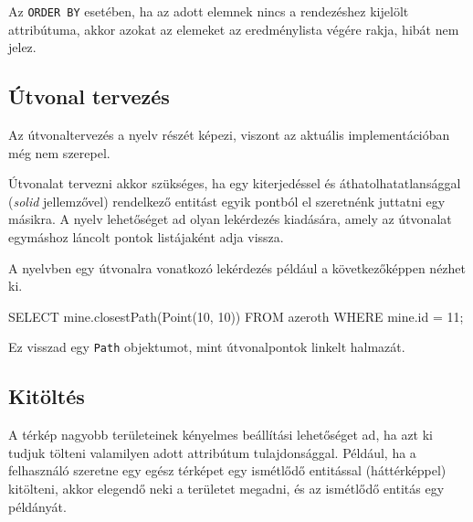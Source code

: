 Az \texttt{ORDER BY} esetében, ha az adott elemnek nincs a rendezéshez kijelölt attribútuma, akkor azokat az elemeket az eredménylista végére rakja, hibát nem jelez.

\subsection{Útvonal tervezés}

Az útvonaltervezés a nyelv részét képezi, viszont az aktuális implementációban még nem szerepel.

Útvonalat tervezni akkor szükséges, ha egy kiterjedéssel és áthatolhatatlansággal (\textit{solid} jellemzővel) rendelkező entitást egyik pontból el szeretnénk juttatni egy másikra. A nyelv lehetőséget ad olyan lekérdezés kiadására, amely az útvonalat egymáshoz láncolt pontok listájaként adja vissza.

A nyelvben egy útvonalra vonatkozó lekérdezés például a következőképpen nézhet ki.
\begin{sql}
SELECT mine.closestPath(Point(10, 10))
FROM azeroth WHERE mine.id = 11;
\end{sql}
Ez visszad egy \texttt{Path} objektumot, mint útvonalpontok linkelt halmazát.

\subsection{Kitöltés}

A térkép nagyobb területeinek kényelmes beállítási lehetőséget ad, ha azt ki tudjuk tölteni valamilyen adott attribútum tulajdonsággal. Például, ha a felhasználó szeretne egy egész térképet egy ismétlődő entitással (háttérképpel) kitölteni, akkor elegendő neki a területet megadni, és az ismétlődő entitás egy példányát.
